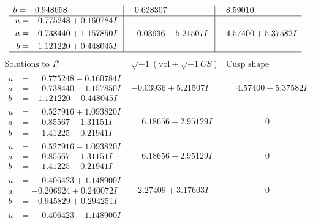 \documentclass[1p]{elsarticle_modified}
\theoremstyle{definition}
\newcommand{\I}{\sqrt{-1}}
\begin{document}
$$\begin{array}{c|c|c}
\begin{aligned}
b &= \phantom{-}0.948658\phantom{ +0.000000I}\end{aligned}
 & \phantom{-}0.628307\phantom{ +0.000000I} & \phantom{-}8.59010\phantom{ +0.000000I} \\ \hline\begin{aligned}
u &= \phantom{-}0.775248 + 0.160784 I \\
a &= \phantom{-}0.738440 + 1.157850 I \\
b &= -1.121220 + 0.448045 I\end{aligned}
 & -0.03936 - 5.21507 I & \phantom{-}4.57400 + 5.37582 I\\
 \hline 
 \end{array}$$\newpage$$\begin{array}{c|c|c}  
\text{Solutions to }I^u_{1}& \I (\text{vol} + \sqrt{-1}CS) & \text{Cusp shape}\\
 \hline 
\begin{aligned}
u &= \phantom{-}0.775248 - 0.160784 I \\
a &= \phantom{-}0.738440 - 1.157850 I \\
b &= -1.121220 - 0.448045 I\end{aligned}
 & -0.03936 + 5.21507 I & \phantom{-}4.57400 - 5.37582 I \\ \hline\begin{aligned}
u &= \phantom{-}0.527916 + 1.093820 I \\
a &= \phantom{-}0.85567 + 1.31151 I \\
b &= \phantom{-}1.41225 - 0.21941 I\end{aligned}
 & \phantom{-}6.18656 + 2.95129 I & \phantom{-0.000000 } 0 \\ \hline\begin{aligned}
u &= \phantom{-}0.527916 - 1.093820 I \\
a &= \phantom{-}0.85567 - 1.31151 I \\
b &= \phantom{-}1.41225 + 0.21941 I\end{aligned}
 & \phantom{-}6.18656 - 2.95129 I & \phantom{-0.000000 } 0 \\ \hline\begin{aligned}
u &= \phantom{-}0.406423 + 1.148900 I \\
a &= -0.206924 + 0.240072 I \\
b &= -0.945829 + 0.294251 I\end{aligned}
 & -2.27409 + 3.17603 I & \phantom{-0.000000 } 0 \\ \hline\begin{aligned}
u &= \phantom{-}0.406423 - 1.148900 I \\

\end{aligned}
\end{array}$$
\end{document}
